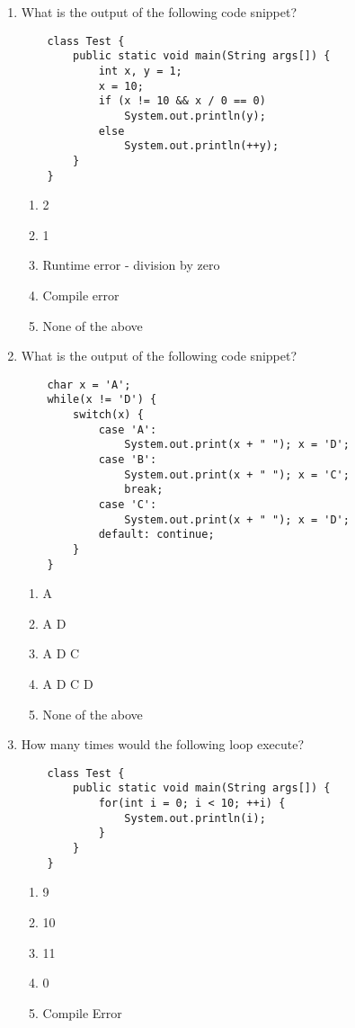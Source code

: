 \documentclass[S17-Final.tex]{subfiles}
\begin{document}
\begin{enumerate}
\item What is the output of the following code snippet?
\begin{lstlisting}
    class Test {
        public static void main(String args[]) {
            int x, y = 1;
            x = 10;
            if (x != 10 && x / 0 == 0)
                System.out.println(y);
            else
                System.out.println(++y);
        }
    }
\end{lstlisting}
	
\begin{enumerate}
\item  2
\item  1
\item  Runtime error - division by zero
\item  Compile error
\item  None of the above
\end{enumerate}

\item What is the output of the following code snippet?
\begin{lstlisting}
    char x = 'A';
    while(x != 'D') { 
        switch(x) { 
            case 'A': 
                System.out.print(x + " "); x = 'D'; 
            case 'B': 
                System.out.print(x + " "); x = 'C'; 
                break; 
            case 'C': 
                System.out.print(x + " "); x = 'D'; 
            default: continue;
        }
    }

\end{lstlisting}
	
\begin{enumerate}
\item  A
\item  A D
\item  A D C
\item  A D C D
\item  None of the above
\end{enumerate}

\item How many times would the following loop execute?
\begin{lstlisting}
    class Test {
        public static void main(String args[]) {
            for(int i = 0; i < 10; ++i) {
                System.out.println(i);
            }
        }
    }
\end{lstlisting}
	
\begin{enumerate}
\item  9
\item  10
\item  11
\item  0
\item  Compile Error
\end{enumerate}


\end{enumerate}
\end{document}
